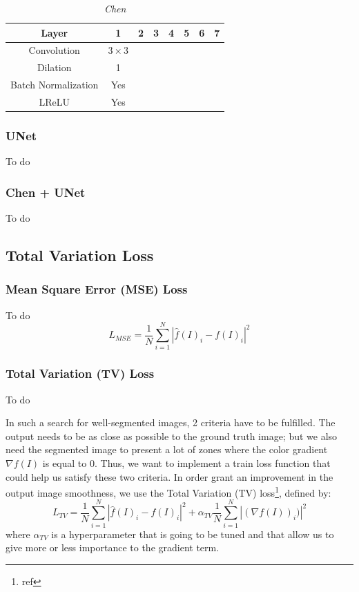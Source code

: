 \documentclass{article}
\begin{document}
            \begin{table}[!ht]
                \centering
                \begin{tabular}{|c|c|c|c|c|c|c|c|}
                    \hline
                    Layer & 1 & 2 & 3 & 4 & 5 & 6 & 7\\
                    \hline \hline
                    Convolution & $3\times3$ & & & & & & \\
                    \hline
                    Dilation & 1 & & & & & & \\
                    \hline
                    Batch Normalization & Yes & & & & & & \\
                    \hline
                    LReLU & Yes & & & & & & \\
                    \hline
                \end{tabular}
                \caption{\textit{Chen}}
            \end{table}

        \subsubsection{UNet}
        To do
        \subsubsection{Chen + UNet}
        To do

    \subsection{Total Variation Loss}
        \subsubsection{Mean Square Error (MSE) Loss}
        To do
        $$L_{MSE}=\frac{1}{N}\sum_{i=1}^N |\hat{f}(I)_i-f(I)_i|^2$$

        \subsubsection{Total Variation (TV) Loss}
        To do

        In such a search for well-segmented images, 2 criteria have to be fulfilled. The output needs to be as close as possible to the ground truth image; but we also need the segmented image to present a lot of zones where the color gradient $\nabla f(I)$ is equal to $0$. Thus, we want to implement a train loss function that could help us satisfy these two criteria.
        In order grant an improvement in the output image smoothness, we use the Total Variation (TV) loss\footnote{ref}, defined by:
        $$
        L_{TV}=\frac{1}{N}\sum_{i=1}^N |\hat{f}(I)_i-f(I)_i|^2+\alpha_{TV}\frac{1}{N}\sum_{i=1}^N|(\nabla f(I))_i)|^2
        $$
        where $\alpha_{TV}$ is a hyperparameter that is going to be tuned and that allow us to give more or less importance to the gradient term.
\end{document}
